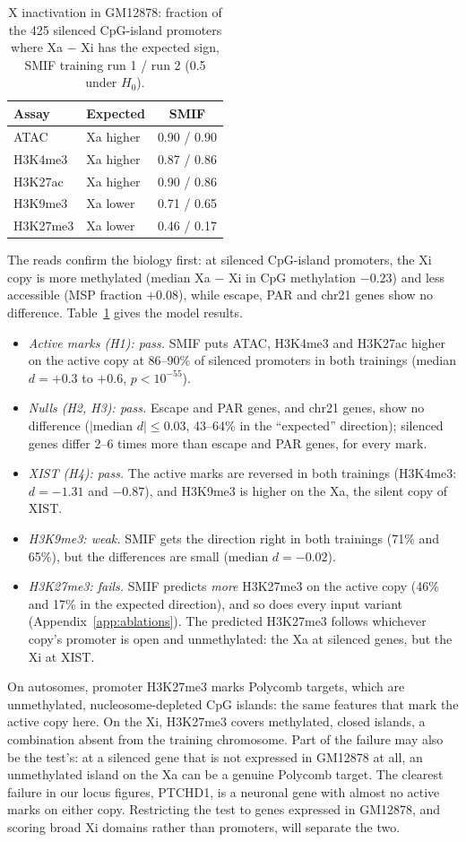 \documentclass[acmtog,nonacm]{acmart}   %
\begin{document}
\begin{table}[t]
\caption{X inactivation in GM12878: fraction of the 425 silenced CpG-island promoters where Xa $-$ Xi has the
expected sign, SMIF training run 1 / run 2 (0.5 under $H_0$).}
\label{tab:xi}
\small
\begin{tabular}{@{}llc@{}}
\toprule
Assay & Expected & SMIF \\
\midrule
ATAC & Xa higher & 0.90 / 0.90 \\
H3K4me3 & Xa higher & 0.87 / 0.86 \\
H3K27ac & Xa higher & 0.90 / 0.86 \\
H3K9me3 & Xa lower & 0.71 / 0.65 \\
H3K27me3 & Xa lower & 0.46 / 0.17 \\
\bottomrule
\end{tabular}
\end{table}

The reads confirm the biology first: at silenced CpG-island promoters, the Xi copy is more methylated (median Xa
$-$ Xi in CpG methylation $-0.23$) and less accessible (MSP fraction $+0.08$), while escape, PAR and chr21 genes
show no difference. Table~\ref{tab:xi} gives the model results.
\begin{itemize}
  \item \emph{Active marks (H1): pass.} SMIF puts ATAC, H3K4me3 and H3K27ac higher on the active copy at 86--90\%
    of silenced promoters in both trainings (median $d=+0.3$ to $+0.6$, $p<10^{-55}$).
  \item \emph{Nulls (H2, H3): pass.} Escape and PAR genes, and chr21 genes, show no difference ($|$median $d|\le0.03$,
    43--64\% in the ``expected'' direction); silenced genes differ 2--6 times more than escape and PAR genes, for
    every mark.
  \item \emph{XIST (H4): pass.} The active marks are reversed in both trainings (H3K4me3: $d=-1.31$ and $-0.87$),
    and H3K9me3 is higher on the Xa, the silent copy of XIST.
  \item \emph{H3K9me3: weak.} SMIF gets the direction right in both trainings (71\% and 65\%), but the differences
    are small (median $d=-0.02$).
  \item \emph{H3K27me3: fails.} SMIF predicts \emph{more} H3K27me3 on the active copy (46\% and 17\% in the expected
    direction), and so does every input variant (Appendix~\ref{app:ablations}). The predicted H3K27me3 follows
    whichever copy's promoter is open and unmethylated: the Xa at silenced genes, but the Xi at XIST.
\end{itemize}
On autosomes, promoter H3K27me3 marks Polycomb targets, which are unmethylated, nucleosome-depleted CpG islands:
the same features that mark the active copy here. On the Xi, H3K27me3 covers methylated, closed islands, a
combination absent from the training chromosome. Part of the failure may also be the test's: at a silenced gene
that is not expressed in GM12878 at all, an unmethylated island on the Xa can be a genuine Polycomb target. The
clearest failure in our locus figures, PTCHD1, is a neuronal gene with almost no active marks on either copy.
Restricting the test to genes expressed in GM12878, and scoring broad Xi domains rather than promoters, will
separate the two.
\end{document}
